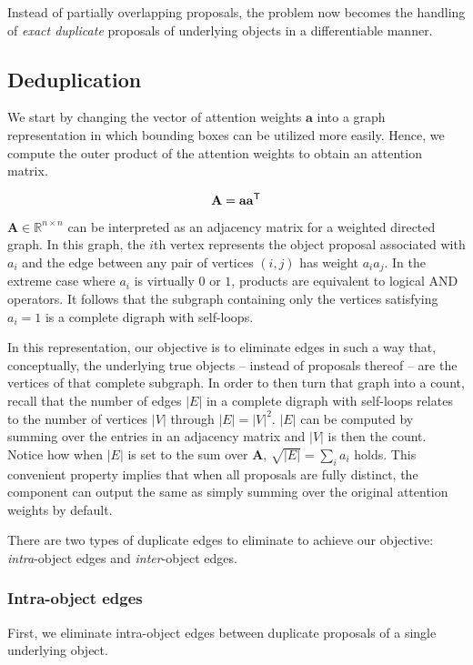 \documentclass[letterpaper]{article}
\newcommand{\m}[1]{\mathbf{#1}}
\begin{document}
Instead of partially overlapping proposals, the problem now becomes the handling of \emph{exact duplicate} proposals of underlying objects in a differentiable manner.


\subsection{Deduplication}
We start by changing the vector of attention weights $\m a$ into a graph representation in which bounding boxes can be utilized more easily.
Hence, we compute the outer product of the attention weights to obtain an attention matrix.

\begin{equation}
    \m A = \m a\m a^\T
\end{equation}

$\m A \in \mathbb{R}^{n \times n}$ can be interpreted as an adjacency matrix for a weighted directed graph.
In this graph, the $i$th vertex represents the object proposal associated with $a_i$ and the edge between any pair of vertices $(i, j)$ has weight $a_i a_j$.
In the extreme case where $a_i$ is virtually $0$ or $1$, products are equivalent to logical AND operators.
It follows that the subgraph containing only the vertices satisfying $a_i = 1$ is a complete digraph with self-loops.

In this representation, our objective is to eliminate edges in such a way that, conceptually, the underlying true objects -- instead of proposals thereof -- are the vertices of that complete subgraph.
In order to then turn that graph into a count, recall that the number of edges $|E|$ in a complete digraph with self-loops relates to the number of vertices $|V|$ through $|E| = |V|^2$.
$|E|$ can be computed by summing over the entries in an adjacency matrix and $|V|$ is then the count.
Notice how when $|E|$ is set to the sum over $\m A$, $\sqrt{|E|} = \sum_i a_i$ holds.
This convenient property implies that when all proposals are fully distinct, the component can output the same as simply summing over the original attention weights by default.

There are two types of duplicate edges to eliminate to achieve our objective: \emph{intra}-object edges and \emph{inter}-object edges.

\subsubsection{Intra-object edges}

First, we eliminate intra-object edges between duplicate proposals of a single underlying object.
\end{document}
